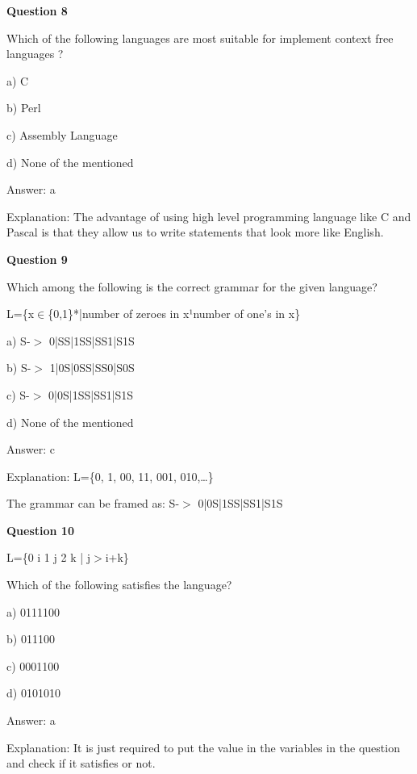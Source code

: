 \documentclass{article}
\begin{document}
\begin{mdframed}[linewidth=1pt, roundcorner=5pt, linecolor=gray!30, backgroundcolor=gray!5]
\textbf{Question 8} 

Which of the following languages are most suitable for implement context free languages ?

a) C

b) Perl

c) Assembly Language

d) None of the mentioned
\vspace{5pt} \par
\begin{tcolorbox}[colback=green!5, colframe=green!40!black, title=Solution]
Answer: a

Explanation: The advantage of using high level programming language like C and Pascal is that they allow us to write statements that look more like English.
\end{tcolorbox}
\end{mdframed}
\newpage

\begin{mdframed}[linewidth=1pt, roundcorner=5pt, linecolor=gray!30, backgroundcolor=gray!5]
\textbf{Question 9} 

Which among the following is the correct grammar for the given language?

L=\{x$\in$\{0,1\}*|number of zeroes in x¹number of one's in x\}

a) S-$>$ 0|SS|1SS|SS1|S1S

b) S-$>$ 1|0S|0SS|SS0|S0S

c) S-$>$ 0|0S|1SS|SS1|S1S

d) None of the mentioned
\vspace{5pt} \par
\begin{tcolorbox}[colback=green!5, colframe=green!40!black, title=Solution]
Answer: c

Explanation: L=\{0, 1, 00, 11, 001, 010,…\}

The grammar can be framed as:  S-$>$ 0|0S|1SS|SS1|S1S
\end{tcolorbox}
\end{mdframed}

\begin{mdframed}[linewidth=1pt, roundcorner=5pt, linecolor=gray!30, backgroundcolor=gray!5]
\textbf{Question 10} 

L=\{0
i
1
j
2
k
 | j$>$i+k\}

Which of the following satisfies the language?

a) 0111100

b) 011100

c) 0001100

d) 0101010
\vspace{5pt} \par
\begin{tcolorbox}[colback=green!5, colframe=green!40!black, title=Solution]
Answer: a

Explanation: It is just required to put the value in the variables in the question and check if it satisfies or not.
\end{tcolorbox}
\end{mdframed}
\newpage
\end{document}
